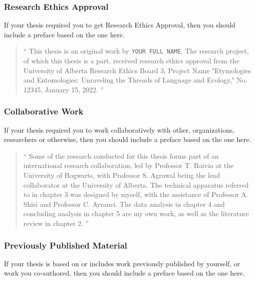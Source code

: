 
			\subsubsection{Research Ethics Approval}
				If your thesis required you to get Research Ethics Approval, then you should include a preface based on the one here.

				\begin{quote}
					\enquote{
						This thesis is an original work by \texttt{YOUR FULL NAME}. 
						The research project, of which this thesis is a part, received research ethics approval from the University of Alberta Research Ethics Board 3, Project Name "Etymologies and Entomologies: Unraveling the Threads of Language and Ecology," No. 12345, January 15, 2022.  
					}
				\end{quote}

			\subsubsection{Collaborative Work}
				If your thesis required you to work collaboratively with other, organizations, researchers or otherwise, then you should include a preface based on the one here.

				\begin{quote}
					\enquote{
						Some of the research conducted for this thesis forms part of an international research collaboration, led by Professor T. Raivio at the University of Hogwarts, with Professor S. Agrawal being the lead collaborator at the University of Alberta. 
						The technical apparatus referred to in chapter 3 was designed by myself, with the assistance of Professor A. Shiri and Professor C. Ayranci. 
						The data analysis in chapter 4 and concluding analysis in chapter 5 are my own work, as well as the literature review in chapter 2.  
					}
				\end{quote}

			\subsubsection{Previously Published Material}
				If your thesis is based on or includes work previously published by yourself, or work you co-authored, then you should include a preface based on the one here.

